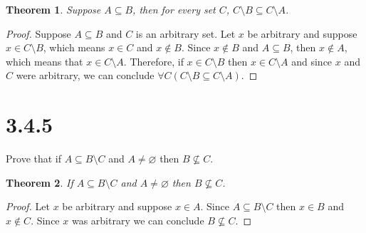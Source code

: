 \documentclass{article}
\newtheorem*{theorem}{Theorem}  %
\begin{document}
\begin{theorem} Suppose $A \subseteq B$, then for every set $C$, $C \setminus B \subseteq C \setminus A$.
\end{theorem}
\begin{proof}
Suppose $A \subseteq B$ and $C$ is an arbitrary set. Let $x$ be arbitrary and suppose $x \in C \setminus B$, which means $x \in C$ and $x \notin B$. Since $x \notin B$ and $A \subseteq B$, then $x \notin A$, which means that $x \in C \setminus A$. Therefore, if $x \in C \setminus B$ then $x \in C \setminus A$ and since $x$ and $C$ were arbitrary, we can conclude $\forall C (C \setminus B \subseteq C \setminus A).$
\end{proof}

\section*{3.4.5}
Prove that if $A \subseteq B \setminus C$ and $A \neq \varnothing$ then $B \not\subseteq C$.

\begin{theorem} If $A \subseteq B \setminus C$ and $A \neq \varnothing$ then $B \not\subseteq C$.
\end{theorem}
\begin{proof}
Let $x$ be arbitrary and suppose $x \in A$. Since $A \subseteq B \setminus C$ then $x \in B$ and $x \notin C$. Since $x$ was arbitrary we can conclude $B \not\subseteq C$.
\end{proof}
\end{document}
